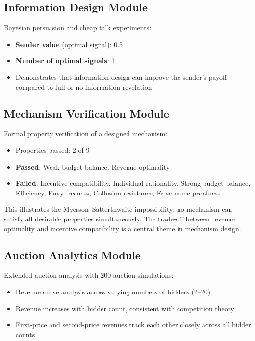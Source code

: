 \documentclass[10pt]{article}
\begin{document}
\subsection{Information Design Module}

Bayesian persuasion and cheap talk experiments:
\begin{itemize}[leftmargin=*,itemsep=1pt]
  \item \textbf{Sender value} (optimal signal): 0.5
  \item \textbf{Number of optimal signals}: 1
  \item Demonstrates that information design can improve the sender's payoff compared to full or no information revelation.
\end{itemize}

\subsection{Mechanism Verification Module}

Formal property verification of a designed mechanism:
\begin{itemize}[leftmargin=*,itemsep=1pt]
  \item Properties passed: 2 of 9
  \item \textbf{Passed}: Weak budget balance, Revenue optimality
  \item \textbf{Failed}: Incentive compatibility, Individual rationality, Strong budget balance, Efficiency, Envy freeness, Collusion resistance, False-name proofness
\end{itemize}

This illustrates the Myerson--Satterthwaite impossibility: no mechanism can satisfy all desirable properties simultaneously. The trade-off between revenue optimality and incentive compatibility is a central theme in mechanism design.

\subsection{Auction Analytics Module}

Extended auction analysis with 200 auction simulations:
\begin{itemize}[leftmargin=*,itemsep=1pt]
  \item Revenue curve analysis across varying numbers of bidders (2--20)
  \item Revenue increases with bidder count, consistent with competition theory
  \item First-price and second-price revenues track each other closely across all bidder counts
\end{itemize}
\end{document}
